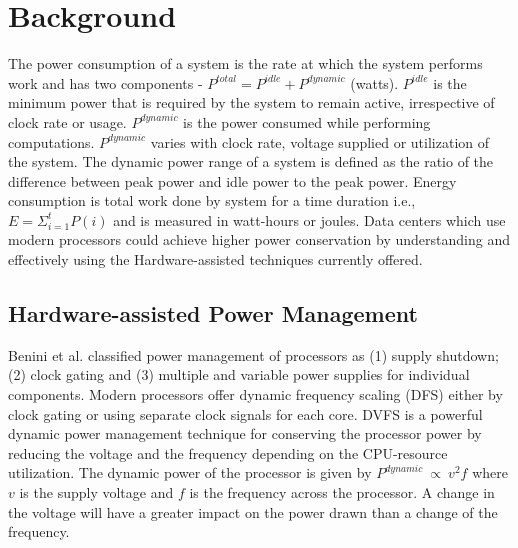 \documentclass{sig-alternate}
\begin{document}
\section{Background}
\label{sec:background}
The power consumption of a system is the rate at which the system performs work and has two components - $P^{total} = P^{idle} + P^{dynamic}$ (watts). $P^{idle}$ is the minimum power that is required by the system to remain active, irrespective of clock rate or usage. $P^{dynamic}$ is the power consumed while performing computations. $P^{dynamic}$ varies with clock rate, voltage supplied or utilization of the system. The dynamic power range of a system is defined as the ratio of the difference between peak power and idle power to the peak power. Energy consumption is total work done by system for a time duration i.e., $E = \Sigma ^t _{i=1}P(i)$ and is measured in watt-hours or joules. Data centers which use modern processors could achieve higher power conservation by understanding and effectively using the Hardware-assisted techniques currently offered. 
\subsection{Hardware-assisted Power Management}
Benini et al. \cite{Benini2000} classified power management of processors as (1) supply shutdown; (2) clock gating and (3) multiple and variable power supplies for individual components. Modern processors offer dynamic frequency scaling (DFS) either by clock gating or using separate clock signals for each core. DVFS is a powerful dynamic power management technique for conserving the processor power by reducing the voltage and the frequency depending on the CPU-resource utilization. The dynamic power of the processor is given by $P^{dynamic} \ \propto \ v^{2} f$ where $v$ is the supply voltage and $f$ is the frequency across the processor. A change in the voltage will have a greater impact on the power drawn than a change of the frequency. 
\end{document}
